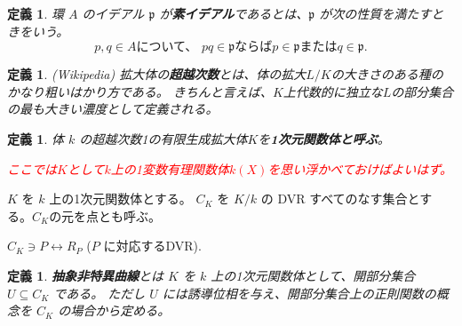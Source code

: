 \documentclass[uplatex]{jsreport}
\newtheorem{dfn}[thm]{定義}
\newcommand{\mfp}{\mathfrak{p}}
\begin{document}
\begin{dfn}
    環 $A$ のイデアル $\mfp$ が\textbf{素イデアル}であるとは、$\mfp$ が次の性質を満たすときをいう。
    \[
        p, q \in A \text{について、\ } pq \in \mfp \text{ならば} p \in \mfp \text{または} q \in \mfp.
    \]
\end{dfn}

\begin{dfn}
    (Wikipedia) 拡大体の{\bf 超越次数}とは、体の拡大$L/K$の大きさのある種のかなり粗いはかり方である。
    きちんと言えば、$K$上代数的に独立な$L$の部分集合の最も大きい濃度として定義される。
\end{dfn}

\begin{dfn}
体 $k$ の超越次数1の有限生成拡大体$K$を{\bf 1次元関数体と呼ぶ}。

\textcolor{red}{ここでは$K$として$k$上の1変数有理関数体$k(X)$を思い浮かべておけばよいはず。}
\end{dfn}

$K$ を $k$ 上の1次元関数体とする。
$C_K$ を $K/k$ の DVR すべてのなす集合とする。$C_K$の元を点とも呼ぶ。
\begin{center}
    $C_K \ni P \leftrightarrow R_P$ ($P$ に対応するDVR).
\end{center}

\begin{dfn}
    {\bf 抽象非特異曲線}とは $K$ を $k$ 上の1次元関数体として、開部分集合 $U \subseteq C_K$ である。
    ただし $U$ には誘導位相を与え、開部分集合上の正則関数の概念を $C_K$ の場合から定める。
\end{dfn}
\end{document}

